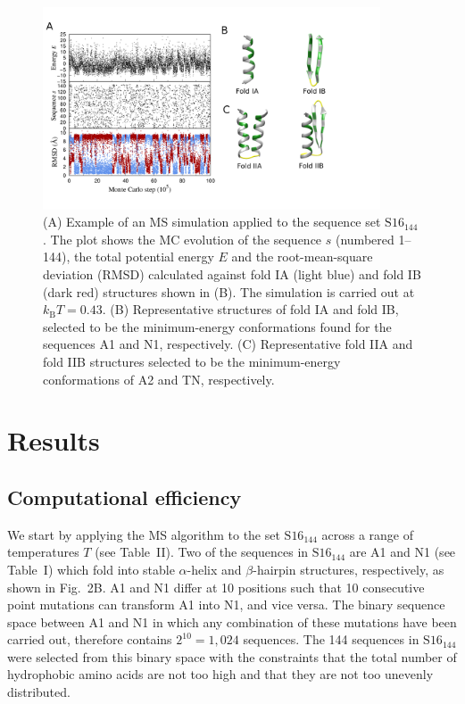 \documentclass[
aip,
rsi,%
amsmath,amssymb,
reprint,%
]{revtex4-1}
\newcommand	 {\sbar}	{{s}}
\newcommand	 {\kb}		{{k_\mathrm{B}}}
\newcommand {\SR}		{${\mathrm{S16}_{144}}$}
\begin{document}
\begin{figure}
\includegraphics[width=10.0cm]{MCTrajFolds}
\caption{(A) Example of an MS simulation applied to the sequence set $\mathrm{S16}_{144}$. The plot shows the MC evolution of the sequence $\sbar$ (numbered 1--144), the total potential energy $E$ and the root-mean-square deviation (RMSD) calculated against fold IA (light blue) and fold IB (dark red) structures shown in (B). The simulation is carried out at $\kb T = 0.43$. (B) Representative structures of fold IA and fold IB, selected to be the minimum-energy conformations found for the sequences A1 and N1, respectively. (C) Representative fold IIA and fold IIB structures selected to be the minimum-energy conformations of A2 and TN, respectively. }
\end{figure}

\section{Results}

\subsection{Computational efficiency}
\noindent
We start by applying the MS algorithm to the set {\SR} across a range of temperatures $T$ (see Table~II). Two of the sequences in {\SR} are A1 and N1 (see Table~I) which fold into stable $\alpha$-helix and $\beta$-hairpin structures, respectively, as shown in Fig.~2B. A1 and N1 differ at 10 positions such that 10 consecutive point mutations can transform A1 into N1, and vice versa. The binary sequence space between A1 and N1 in which any combination of these mutations have been carried out, therefore contains $2^{10}=1,024$ sequences. The 144 sequences in {\SR} were selected from this binary space with the constraints that the total number of hydrophobic amino acids are not too high and that they are not too unevenly distributed.~\cite{Holzgrafe2014}
\end{document}
